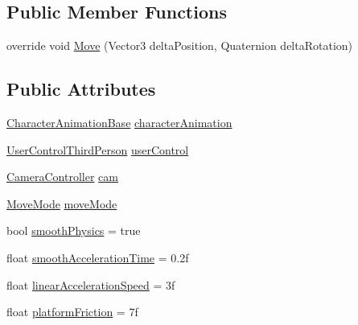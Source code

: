 \subsection*{Public Member Functions}
\begin{DoxyCompactItemize}
\item 
override void \mbox{\hyperlink{class_root_motion_1_1_demos_1_1_character_third_person_a6100d2dbc651cfb14d253c09dc67f8b1}{Move}} (Vector3 delta\+Position, Quaternion delta\+Rotation)
\end{DoxyCompactItemize}
\subsection*{Public Attributes}
\begin{DoxyCompactItemize}
\item 
\mbox{\hyperlink{class_root_motion_1_1_demos_1_1_character_animation_base}{Character\+Animation\+Base}} \mbox{\hyperlink{class_root_motion_1_1_demos_1_1_character_third_person_a2ba535c60de308582fa328b76afe63a1}{character\+Animation}}
\item 
\mbox{\hyperlink{class_root_motion_1_1_demos_1_1_user_control_third_person}{User\+Control\+Third\+Person}} \mbox{\hyperlink{class_root_motion_1_1_demos_1_1_character_third_person_a5fc5b07e1942109dbefff210bfb6848e}{user\+Control}}
\item 
\mbox{\hyperlink{class_root_motion_1_1_camera_controller}{Camera\+Controller}} \mbox{\hyperlink{class_root_motion_1_1_demos_1_1_character_third_person_aa6ac2e1172a7e17dde8db10def50dfae}{cam}}
\item 
\mbox{\hyperlink{class_root_motion_1_1_demos_1_1_character_third_person_aef170847340acae97eb1c87e647eead2}{Move\+Mode}} \mbox{\hyperlink{class_root_motion_1_1_demos_1_1_character_third_person_aa6cfbaecc03119a27aabab86610d86d0}{move\+Mode}}
\item 
bool \mbox{\hyperlink{class_root_motion_1_1_demos_1_1_character_third_person_a00efd4d721afc5534b5577aa7cdeec88}{smooth\+Physics}} = true
\item 
float \mbox{\hyperlink{class_root_motion_1_1_demos_1_1_character_third_person_affec006d45e844d8674dfd1db5479bf5}{smooth\+Acceleration\+Time}} = 0.\+2f
\item 
float \mbox{\hyperlink{class_root_motion_1_1_demos_1_1_character_third_person_a38184a75db9c7e7dc460d2337d6884a6}{linear\+Acceleration\+Speed}} = 3f
\item 
float \mbox{\hyperlink{class_root_motion_1_1_demos_1_1_character_third_person_ae6e068d8d7e3b352eb938b0bd97205ad}{platform\+Friction}} = 7f

\end{DoxyCompactItemize}
